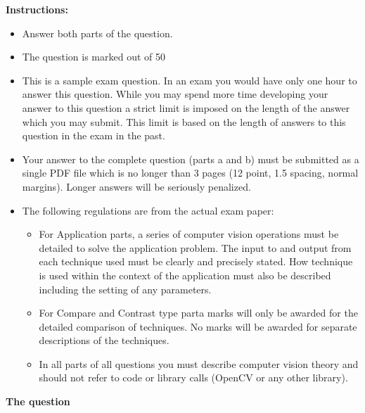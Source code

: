 \documentclass[a4paper]{article}
\begin{document}
\textbf{Instructions:}
\begin{itemize}
    \item Answer both parts of the question.
    \item The question is marked out of 50
    \item This is a sample exam question.  In an exam you would have only one hour to answer this question.  While you may spend more time developing your answer to this question a strict limit is imposed on the length of the answer which you may submit.  This limit is based on the length of answers to this question in the exam in the past.
    \item Your answer to the complete question (parts a and b) must be submitted as a single PDF file which is no longer than 3 pages (12 point, 1.5 spacing, normal margins).  Longer answers will be seriously penalized.
    \item The following regulations are from the actual exam paper:    
    \begin{itemize}
        \item For Application parts, a series of computer vision operations must be detailed to solve the application problem. The input to and output from each technique used must be clearly and precisely stated.  How technique is used within the context of the application must also be described including the setting of any parameters.
        \item For Compare and Contrast type parta marks will only be awarded for the detailed comparison of techniques.  No marks will be awarded for separate descriptions of the techniques.
        \item In all parts of all questions you must describe computer vision theory and should not refer to code or library calls (OpenCV or any other library).
    \end{itemize}
\end{itemize}

\textbf{The question}
\end{document}
